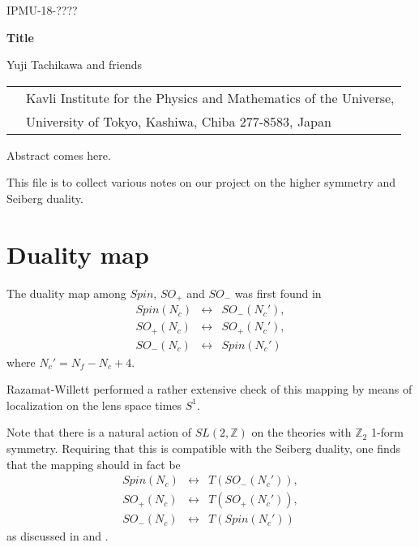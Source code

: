 \documentclass[12pt]{article}
\numberwithin{equation}{section}
\def\bZ{\mathbb{Z}}
\begin{document}
\begin{titlepage}

\begin{flushright}
IPMU-18-????
\end{flushright}

\vskip 3cm

\begin{center}

{\Large \bfseries Title}


\vskip 1cm
Yuji Tachikawa and friends
\vskip 1cm

\begin{tabular}{ll}
 & Kavli Institute for the Physics and Mathematics of the Universe, \\
& University of Tokyo,  Kashiwa, Chiba 277-8583, Japan
\end{tabular}


\vskip 1cm

\end{center}


\noindent
Abstract comes here.

\end{titlepage}

\setcounter{tocdepth}{2}
\tableofcontents

\newpage

\fi

This file is to collect various notes on our project on the higher symmetry and Seiberg duality.

\section{Duality map}

The duality map among $Spin$, $SO_+$ and $SO_-$ was first found in \cite{Aharony:2013hda}
 \begin{equation}
\begin{array}{ccc}
	Spin(N_c) & \leftrightarrow & SO_-(N_c'),\\
	SO_+(N_c) & \leftrightarrow & SO_+(N_c'),\\
	SO_-(N_c) & \leftrightarrow & Spin(N_c')
\end{array}
\end{equation} where $N_c'=N_f-N_c+4$.

Razamat-Willett \cite{Razamat:2013opa} performed a rather extensive check of this mapping by means of localization on the lens space times $S^1$.

Note that there is a natural action of $SL(2,\bZ)$ on the theories with $\bZ_2$ 1-form symmetry.
Requiring that this is compatible with the Seiberg duality, one finds that the mapping should in fact be  \begin{equation}
\begin{array}{ccc}
	Spin(N_c) & \leftrightarrow & T(SO_-(N_c')),\\
	SO_+(N_c) & \leftrightarrow & T(SO_+(N_c')),\\ 
	SO_-(N_c) & \leftrightarrow & T(Spin(N_c'))
\end{array}
\end{equation} 
as discussed in \cite[Sec.~6]{Gaiotto:2014kfa} and \cite{Bhardwaj:2020ymp}.
\end{document}
